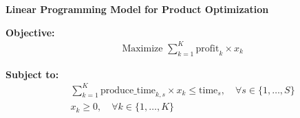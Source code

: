 \documentclass{article}
\begin{document}
\textbf{Linear Programming Model for Product Optimization}

\textbf{Objective:}
\begin{align*}
  & \text{Maximize } \sum_{k=1}^{K} \text{profit}_k \times x_k
\end{align*}

\textbf{Subject to:}
\begin{align*}
  & \sum_{k=1}^{K} \text{produce\_time}_{k, s} \times x_k \leq \text{time}_{s}, \quad \forall s \in \{1, \ldots, S\} \\
  & x_k \geq 0, \quad \forall k \in \{1, \ldots, K\}
\end{align*}
\end{document}

